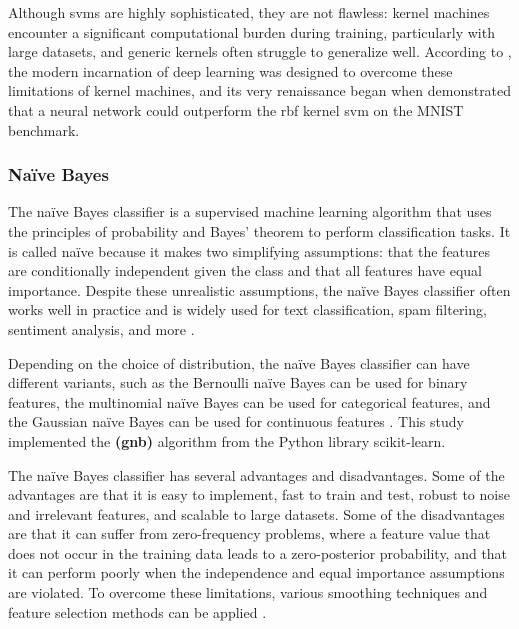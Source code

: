 Although \gls{svm}s are highly sophisticated, they are not flawless: kernel machines encounter a significant computational burden during training, particularly with large datasets, and generic kernels often struggle to generalize well. According to \textcite{Goodfellow2016}, the modern incarnation of deep learning was designed to overcome these limitations of kernel machines, and its very renaissance began when \textcite{Hinton2006} demonstrated that a neural network could outperform the \gls{rbf} kernel \gls{svm} on the MNIST benchmark.


\subsubsection{Naïve Bayes}
\label{subsubsec:machine_learning_GNB}

The naïve Bayes classifier is a supervised machine learning algorithm that uses the principles of probability and Bayes' theorem to perform classification tasks. It is called naïve because it makes two simplifying assumptions: that the features are conditionally independent given the class and that all features have equal importance. Despite these unrealistic assumptions, the naïve Bayes classifier often works well in practice and is widely used for text classification, spam filtering, sentiment analysis, and more \cite{Barber2012}.

Depending on the choice of distribution, the naïve Bayes classifier can have different variants, such as the Bernoulli naïve Bayes can be used for binary features, the multinomial naïve Bayes can be used for categorical features, and the Gaussian naïve Bayes can be used for continuous features \cite{Friedman1997}. This study implemented the \textbf{ (\gls{gnb})} algorithm from the Python library scikit-learn.

The naïve Bayes classifier has several advantages and disadvantages. Some of the advantages are that it is easy to implement, fast to train and test, robust to noise and irrelevant features, and scalable to large datasets. Some of the disadvantages are that it can suffer from zero-frequency problems, where a feature value that does not occur in the training data leads to a zero-posterior probability, and that it can perform poorly when the independence and equal importance assumptions are violated. To overcome these limitations, various smoothing techniques and feature selection methods can be applied \cite{Wickramasinghe2021}.

